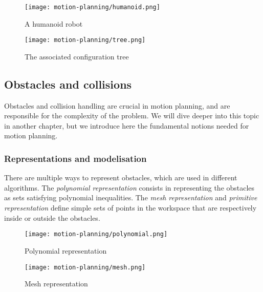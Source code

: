 \begin{figure}[H]
    \centering

    \begin{minipage}{.4\textwidth}
        \centering
        \texttt{[image: motion-planning/humanoid.png]}
        \caption*{A humanoid robot}
    \end{minipage}
    \begin{minipage}{.5\textwidth}
        \centering
        \texttt{[image: motion-planning/tree.png]}
        \caption*{The associated configuration tree}
    \end{minipage}
\end{figure}

\subsection{Obstacles and collisions}
Obstacles and collision handling are crucial in motion planning, and are responsible for the complexity of the problem. We will dive deeper into this topic in another chapter, but we introduce here the fundamental notions needed for motion planning.
\subsubsection{Representations and modelisation}
There are multiple ways to represent obstacles, which are used in different algorithms. The \emph{polynomial representation} consists in representing the obstacles as sets satisfying polynomial inequalities. The \emph{mesh representation} and \emph{primitive representation} define simple sets of points in the workspace that are respectively inside or outside the obstacles.
\begin{figure}[H]
    \centering

    \begin{minipage}{.5\textwidth}
        \centering
        \texttt{[image: motion-planning/polynomial.png]}
        \caption*{Polynomial representation}
    \end{minipage}
    \begin{minipage}{.4\textwidth}
        \centering
        \texttt{[image: motion-planning/mesh.png]}
        \caption*{Mesh representation}
    \end{minipage}
\end{figure}

